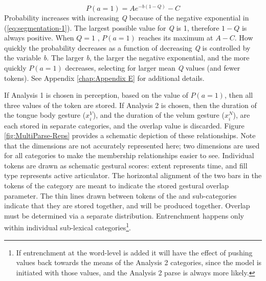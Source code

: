 \begin{equation}
P(a=1)=Ae^{-b(1-Q)}-C\label{eq:segmentation-1}
\end{equation}
Probability increases with increasing \emph{Q} because of the negative
exponential in (\ref{eq:segmentation-1}). The largest possible value
for \emph{Q} is 1, therefore $1-Q$ is always positive. When $Q=1$
, $P(a=1)$ reaches its maximum at $A-C$. How quickly the probability
decreases as a function of decreasing \emph{Q} is controlled by the
variable \emph{b. }The larger \emph{b}, the larger the negative exponential,
and the more quickly $P(a=1)$ decreases, selecting for larger mean
\emph{Q} values (and fewer tokens). See Appendix \ref{chap:Appendix E}
for additional details.

If Analysis 1 is chosen in perception, based on the value of $P(a=1)$,
then all three values of the token are stored. If Analysis 2 is chosen,
then the duration of the tongue body gesture ($x_{i}^{V}$), and the
duration of the velum gesture ($x_{i}^{N}$), are each stored in separate
categories, and the overlap value is discarded. Figure \ref{fig:MultiParse-Reps}
provides a schematic depiction of these relationships. Note that the
dimensions are not accurately represented here; two dimensions are
used for all categories to make the membership relationships easier
to see. Individual tokens are drawn as schematic gestural scores:
extent represents time, and fill type represents active articulator.
The horizontal alignment of the two bars in the tokens of the category
are meant to indicate the stored gestural overlap parameter. The thin
lines drawn between tokens of the and sub-categories indicate that
they are stored together, and will be produced together. Overlap must
be determined via a separate distribution. Entrenchment happens only
within individual sub-lexical categories\footnote{If entrenchment at the word-level is added it will have the effect
of pushing values back towards the means of the Analysis 2 categories,
since the model is initiated with those values, and the Analysis 2
parse is always more likely. }.

